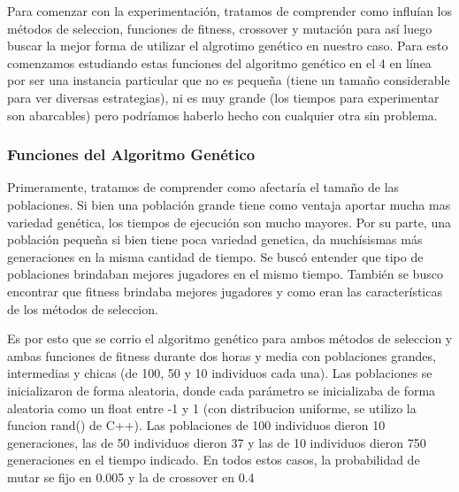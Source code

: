 \documentclass[A4paper,oneside,fleqn,11pt]{article}
\theoremstyle{definition}
\begin{document}
Para comenzar con la experimentación, tratamos de comprender como influían los métodos de seleccion, funciones de fitness, crossover y mutación para así luego buscar la mejor forma de utilizar el algrotimo genético en nuestro caso. Para esto comenzamos estudiando estas funciones del algoritmo genético en el 4 en línea por ser una instancia particular que no es pequeña (tiene un tamaño considerable para ver diversas estrategias), ni es muy grande (los tiempos para experimentar son abarcables) pero podríamos haberlo hecho con cualquier otra sin problema.


\subsubsection{Funciones del Algoritmo Genético}

Primeramente, tratamos de comprender como afectaría el tamaño de las poblaciones. Si bien una población grande tiene como ventaja aportar mucha mas variedad genética, los tiempos de ejecución son mucho mayores. Por su parte, una población pequeña si bien tiene poca variedad genetica, da muchísismas más generaciones en la misma cantidad de tiempo. Se buscó entender que tipo de poblaciones brindaban mejores jugadores en el mismo tiempo. También se busco encontrar que fitness brindaba mejores jugadores y como eran las características de los métodos de seleccion.

Es por esto que se corrio el algoritmo genético para ambos métodos de seleccion y ambas funciones de fitness durante dos horas y media con poblaciones grandes, intermedias y chicas (de 100, 50 y 10 individuos cada una). Las poblaciones se inicializaron de forma aleatoria, donde cada parámetro se inicializaba de forma aleatoria como un float entre -1 y 1 (con distribucion uniforme, se utilizo la funcion rand() de C++). Las poblaciones de 100 individuos dieron 10 generaciones, las de 50 individuos dieron 37 y las de 10 individuos dieron 750 generaciones en el tiempo indicado. En todos estos casos, la probabilidad de mutar se fijo en 0.005 y la de crossover en 0.4
\end{document}
